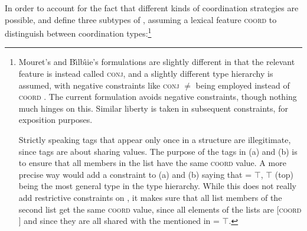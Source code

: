In order to  account for the fact that different kinds of coordination strategies are possible,
\citet[]{Mouret:06} and \citet[]{Bilbiie:17} define three subtypes of
, assuming a lexical feature \textsc{coord} to distinguish between   coordination
types:\footnote{Mouret's and Bı̂lbı̂ie's formulations are slightly different in that the relevant
  feature is instead called \textsc{conj}, and a slightly different type hierarchy is assumed, with
  negative constraints like  \textsc{conj} $\not=$  being employed instead of
  \textsc{coord} . The current formulation   avoids negative constraints, though nothing
  much hinges on this. Similar liberty is taken in subsequent constraints, for exposition purposes.

Strictly speaking tags that appear only once in a structure are illegitimate, since tags are about
sharing values. The purpose of the tags in (a) and (b) is to ensure that all members
in the list have the same \textsc{coord} value. A more precise way would add a constraint to
(a) and (b) saying that  = $\top$, $\top$ (top) being the most general type in the type
hierarchy. While this does not really add restrictive constraints on , it makes sure that
all list members of the second list get the same \textsc{coord} value, since all elements of the
lists are [\textsc{coord} ] and since they are all shared with the  mentioned in
 = $\top$.}
 

\eal
\ex
{}

\ex
{}\label{omni}
\ex
{}
\zl

